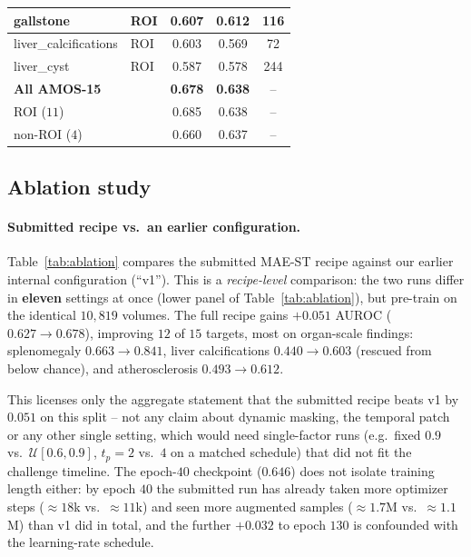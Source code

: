 \documentclass[runningheads]{llncs}
\begin{document}
\begin{table}[htbp]
\begin{tabular}{llccc}
gallstone            & ROI     & 0.607 & 0.612 & 116 \\ \hline
liver\_calcifications & ROI     & 0.603 & 0.569 & 72  \\ \hline
liver\_cyst           & ROI     & 0.587 & 0.578 & 244 \\ \hline
\textbf{All AMOS-15}  &         & \textbf{0.678} & \textbf{0.638} & -- \\ \hline
ROI ($11$)           &         & 0.685 & 0.638 & -- \\ \hline
non-ROI ($4$)        &         & 0.660 & 0.637 & -- \\ \hline
\end{tabular}
\end{table}

\subsection{Ablation study}
\label{sec:ablation}

\paragraph{Submitted recipe vs.\ an earlier configuration.}
Table~\ref{tab:ablation} compares the submitted MAE-ST recipe against our
earlier internal configuration (``v1''). This is a \emph{recipe-level}
comparison: the two runs differ in \textbf{eleven} settings at once (lower panel
of Table~\ref{tab:ablation}), but pre-train on the identical $10{,}819$ volumes.
The full recipe gains $+0.051$ AUROC ($0.627 \to 0.678$), improving $12$ of $15$
targets, most on organ-scale findings: splenomegaly $0.663\!\to\!0.841$,
liver calcifications $0.440\!\to\!0.603$ (rescued from below chance), and
atherosclerosis $0.493\!\to\!0.612$.

This licenses only the aggregate statement that the submitted recipe beats v1 by
$0.051$ on this split -- not any claim about dynamic masking, the temporal patch
or any other single setting, which would need single-factor runs (e.g.\ fixed
$0.9$ vs.\ $\mathcal{U}[0.6,0.9]$, $t_p{=}2$ vs.\ $4$ on a matched schedule) that
did not fit the challenge timeline. The epoch-$40$ checkpoint ($0.646$) does not
isolate training length either: by epoch $40$ the submitted run has already
taken more optimizer steps (${\approx}18$k vs.\ ${\approx}11$k) and seen more
augmented samples (${\approx}1.7$M vs.\ ${\approx}1.1$M) than v1 did in total,
and the further $+0.032$ to epoch $130$ is confounded with the learning-rate
schedule.
\end{document}
